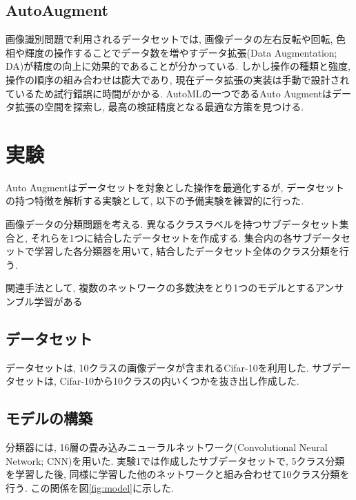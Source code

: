 \documentclass[twocolumn]{jarticle}     %
\begin{document}
\subsection{AutoAugment}

画像識別問題で利用されるデータセットでは, 画像データの左右反転や回転, 色相や輝度の操作することでデータ数を増やすデータ拡張(Data Augmentation; DA)が精度の向上に効果的であることが分かっている.
しかし操作の種類と強度, 操作の順序の組み合わせは膨大であり, 現在データ拡張の実装は手動で設計されているため試行錯誤に時間がかかる.
AutoMLの一つであるAuto Augment\cite{DBLP:journals/corr/abs-1805-09501}はデータ拡張の空間を探索し, 最高の検証精度となる最適な方策を見つける.

\section{実験}
Auto Augmentはデータセットを対象とした操作を最適化するが,
データセットの持つ特徴を解析する実験として, 以下の予備実験を練習的に行った.

画像データの分類問題を考える.
異なるクラスラベルを持つサブデータセット集合と, それらを1つに結合したデータセットを作成する.
集合内の各サブデータセットで学習した各分類器を用いて, 結合したデータセット全体のクラス分類を行う.

関連手法として, 複数のネットワークの多数決をとり1つのモデルとするアンサンブル学習がある

\subsection{データセット}
データセットは, 10クラスの画像データが含まれるCifar-10\cite{cifar10}を利用した.
サブデータセットは, Cifar-10から10クラスの内いくつかを抜き出し作成した.

\subsection{モデルの構築}
分類器には, 16層の畳み込みニューラルネットワーク(Convolutional Neural Network; CNN)を用いた.
実験1では作成したサブデータセットで, 5クラス分類を学習した後, 同様に学習した他のネットワークと組み合わせて10クラス分類を行う. この関係を図\ref{fig:model}に示した.
\end{document}
